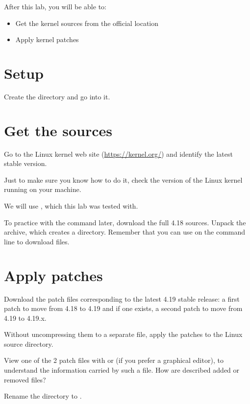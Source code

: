 
After this lab, you will be able to:
\begin{itemize}
\item Get the kernel sources from the official location
\item Apply kernel patches
\end{itemize}

\section{Setup}

Create the  directory and go into it.

\section{Get the sources}

Go to the Linux kernel web site (\url{https://kernel.org/}) and
identify the latest stable version.

Just to make sure you know how to do it, check the version of the
Linux kernel running on your machine.

We will use , which this lab was tested with.

To practice with the  command later, download the full 4.18
sources. Unpack the archive, which creates a 
directory. Remember that you can use  on the command
line to download files.

\section{Apply patches}

Download the patch files corresponding to the latest 4.19 stable
release: a first patch to move from 4.18 to 4.19 and if one exists,
a second patch to move from 4.19 to 4.19.x.

Without uncompressing them to a separate file, apply the patches to the Linux
source directory.

View one of the 2 patch files with  or 
(if you prefer a graphical editor), to understand the information carried
by such a file. How are described added or removed files?

Rename the  directory to .
